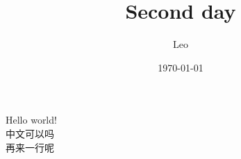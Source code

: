 \documentclass{article}        %
\title{Second day}
\author{Leo}
\date{\today}
\begin{document}
\maketitle

Hello world! \\

中文可以吗 \\

再来一行呢
\end{document}
